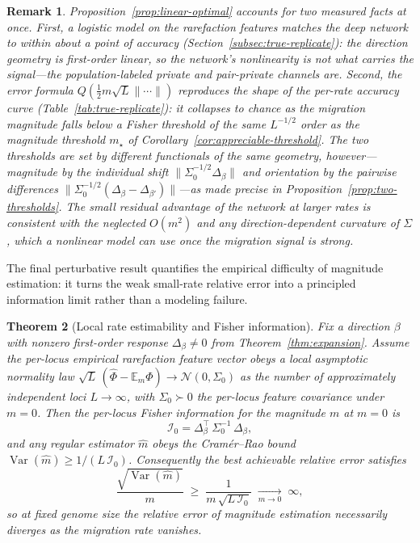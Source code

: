 \documentclass[11pt]{article}
\theoremstyle{plain}
\newtheorem{thm}{Theorem}[section]
\newtheorem{rem}[thm]{Remark}
\theoremstyle{definition}
\theoremstyle{remark}
\begin{document}
\begin{rem}
Proposition~\ref{prop:linear-optimal} accounts for two measured facts at once. First, a logistic
model on the rarefaction features matches the deep network to within about a point of accuracy
(Section~\ref{subsec:true-replicate}): the direction geometry is first-order linear, so the
network's nonlinearity is not what carries the signal---the population-labeled private and
pair-private channels are. Second, the error formula $Q(\tfrac12 m\sqrt L\lVert\cdots\rVert)$
reproduces the shape of the per-rate accuracy curve (Table~\ref{tab:true-replicate}): it collapses
to chance as the migration magnitude falls below a Fisher threshold of the same $L^{-1/2}$ order as
the magnitude threshold $m_\star$ of Corollary~\ref{cor:appreciable-threshold}. The two thresholds
are set by \emph{different} functionals of the same geometry, however---magnitude by the individual
shift $\lVert\Sigma_0^{-1/2}\Delta_\beta\rVert$ and orientation by the pairwise differences
$\lVert\Sigma_0^{-1/2}(\Delta_\beta-\Delta_{\beta'})\rVert$---as made precise in
Proposition~\ref{prop:two-thresholds}. The small residual advantage of the network at larger
rates is consistent with the neglected $O(m^2)$ and any direction-dependent curvature of $\Sigma$,
which a nonlinear model can use once the migration signal is strong.
\end{rem}

The final perturbative result quantifies the empirical difficulty of magnitude estimation: it
turns the weak small-rate relative error into a principled information limit rather than a
modeling failure.

\begin{thm}[Local rate estimability and Fisher information]\label{thm:fisher}
Fix a direction $\beta$ with nonzero first-order response $\Delta_\beta\neq 0$ from
Theorem~\ref{thm:expansion}. Assume the per-locus empirical rarefaction feature vector obeys a
local asymptotic normality law $\sqrt{L}\,(\widehat\Phi-\mathbb{E}_m\Phi)\to
\mathcal{N}(0,\Sigma_0)$ as the number of approximately independent loci $L\to\infty$, with
$\Sigma_0\succ 0$ the per-locus feature covariance under $m=0$. Then the per-locus Fisher
information for the magnitude $m$ at $m=0$ is
\[
\mathcal{I}_0=\Delta_\beta^\top\,\Sigma_0^{-1}\,\Delta_\beta,
\]
and any regular estimator $\widehat m$ obeys the Cram\'er--Rao bound
$\operatorname{Var}(\widehat m)\ge 1/(L\,\mathcal{I}_0)$. Consequently the best achievable
relative error satisfies
\[
\frac{\sqrt{\operatorname{Var}(\widehat m)}}{m}\;\ge\;\frac{1}{m\,\sqrt{L\,\mathcal{I}_0}}
\;\xrightarrow[m\to 0]{}\;\infty,
\]
so at fixed genome size the relative error of magnitude estimation necessarily diverges as the
migration rate vanishes.
\end{thm}
\end{document}
